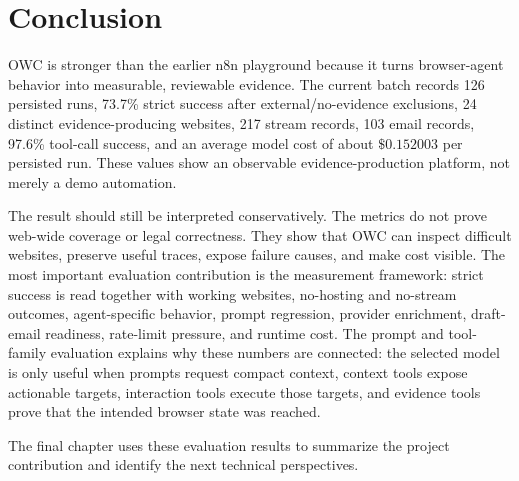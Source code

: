 

\section{Conclusion}

OWC is stronger than the earlier n8n playground because it turns browser-agent behavior
into measurable, reviewable evidence. The current batch records 126 persisted runs,
73.7\% strict success after external/no-evidence exclusions, 24 distinct evidence-producing
websites, 217 stream records, 103 email records, 97.6\% tool-call success, and an
average model cost of about \(\$0.152003\) per persisted run. These values show an
observable evidence-production platform, not merely a demo automation.

The result should still be interpreted conservatively. The metrics do not prove web-wide
coverage or legal correctness. They show that OWC can inspect difficult websites,
preserve useful traces, expose failure causes, and make cost visible. The most important
evaluation contribution is the measurement framework: strict success is read together
with working websites, no-hosting and no-stream outcomes, agent-specific behavior,
prompt regression, provider enrichment, draft-email readiness, rate-limit pressure, and
runtime cost. The prompt and tool-family evaluation explains why these numbers are
connected: the selected model is only useful when prompts request compact context,
context tools expose actionable targets, interaction tools execute those targets, and
evidence tools prove that the intended browser state was reached.

The final chapter uses these evaluation results to summarize the project contribution
and identify the next technical perspectives.
